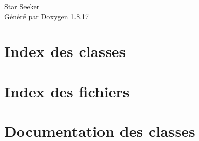 \let\mypdfximage\pdfximage\def\pdfximage{\immediate\mypdfximage}\documentclass[twoside]{book}
\newcommand{\+}{\discretionary{\mbox{\scriptsize$\hookleftarrow$}}{}{}}
\newcommand{\clearemptydoublepage}{%
  \newpage{\pagestyle{empty}\cleardoublepage}%
}
\begin{document}
\hypersetup{pageanchor=false,
             bookmarksnumbered=true,
             pdfencoding=unicode
            }
\begin{titlepage}
\vspace*{7cm}
\begin{center}%
{\Large Star Seeker }\\
\vspace*{1cm}
{\large Généré par Doxygen 1.8.17}\\
\end{center}
\end{titlepage}
\clearemptydoublepage
{}
\tableofcontents
\clearemptydoublepage
{}
\hypersetup{pageanchor=true}

\chapter{Index des classes}

\chapter{Index des fichiers}

\chapter{Documentation des classes}





























\end{document}
